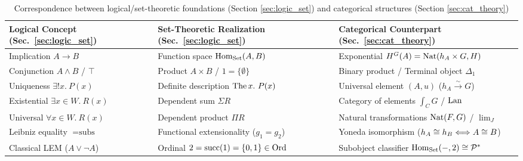 \documentclass[10pt,a4paper]{article}
\begin{document}
\begin{table}[H]
\centering
{\small
\setlength{\tabcolsep}{1.5pt}
\caption{Correspondence between logical/set-theoretic foundations (Section \ref{sec:logic_set}) and categorical structures (Section \ref{sec:cat_theory})}
\label{tab:synthesis}
\begin{tabular}{|l|l|l|}
\hline
\textbf{Logical Concept (Sec.\ \ref{sec:logic_set})} & \textbf{Set-Theoretic Realization (Sec.\ \ref{sec:logic_set})} & \textbf{Categorical Counterpart (Sec.\ \ref{sec:cat_theory})} \\ \hline
\hline
Implication $A \to B$ & Function space ${\textrm{Hom}}_{\textrm{Set}}(A, B)$ & Exponential $H^G(A) = {\textrm{Nat}}(h_A \times G, H)$ \\ \hline
Conjunction $A \land B$ / $\top$ & Product $A \times B$ / $1 = \{\emptyset\}$ & Binary product / Terminal object $\Delta_1$ \\ \hline
Uniqueness $\exists !x.\ P(x)$ & Definite description ${\textrm{The\,}} x.\ P(x)$ & Universal element $(A, u)$ ($h_A \xrightarrow{\sim} G$) \\ \hline
Existential $\exists x \in W.\ R(x)$ & Dependent sum $\Sigma R$ & Category of elements $\int_C G$ / ${\mathrm{Lan}}$ \\ \hline
Universal $\forall x \in W.\ R(x)$ & Dependent product $\Pi R$ & Natural transformations ${\textrm{Nat}}(F, G)$ / $\lim_J$ \\ \hline
Leibniz equality $=\textrm{subs}$ & Functional extensionality ($g_1 = g_2$) & Yoneda isomorphism ($h_A \cong h_B \Longleftrightarrow A \cong B$) \\ \hline
Classical LEM ($A \lor \neg A$) & Ordinal $2 = {\textrm{succ}}(1) = \{0, 1\} \in {\textrm{Ord}}$ & Subobject classifier ${\textrm{Hom}}_{\textrm{Set}}(-, 2) \cong {\mathcal{P}}^*$ \\ \hline
\end{tabular}}
\end{table}
\end{document}
